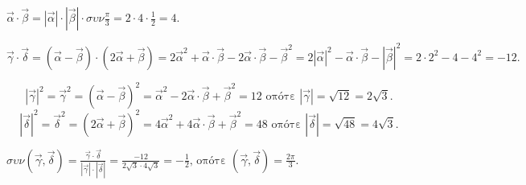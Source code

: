 
 $\vec{\alpha} \cdot \vec{\beta} = |\vec{\alpha}| \cdot |\vec{\beta}| \cdot \sigma\upsilon\nu \frac{\pi}{3} = 2 \cdot 4 \cdot \frac{1}{2} = 4$.

\[
\vec{\gamma} \cdot \vec{\delta} = (\vec{\alpha} - \vec{\beta}) \cdot (2\vec{\alpha} + \vec{\beta}) = 2\vec{\alpha}^2 + \vec{\alpha} \cdot \vec{\beta} - 2\vec{\alpha} \cdot \vec{\beta} - \vec{\beta}^2 = 2|\vec{\alpha}|^2 - \vec{\alpha} \cdot \vec{\beta} - |\vec{\beta}|^2 = 2 \cdot 2^2 - 4 - 4^2 = -12.
\]

\[
|\vec{\gamma}|^2 = \vec{\gamma}^2 = (\vec{\alpha} - \vec{\beta})^2 = \vec{\alpha}^2 - 2\vec{\alpha} \cdot \vec{\beta} + \vec{\beta}^2 = 12 \text{ οπότε } |\vec{\gamma}| = \sqrt{12} = 2\sqrt{3}.
\]
\[
|\vec{\delta}|^2 = \vec{\delta}^2 = (2\vec{\alpha} + \vec{\beta})^2 = 4\vec{\alpha}^2 + 4\vec{\alpha} \cdot \vec{\beta} + \vec{\beta}^2 = 48 \text{ οπότε } |\vec{\delta}| = \sqrt{48} = 4\sqrt{3}.
\]

 $\sigma\upsilon\nu(\vec{\gamma} \hat{,} \vec{\delta}) = \frac{\vec{\gamma} \cdot \vec{\delta}}{|\vec{\gamma}| \cdot |\vec{\delta}|} = \frac{-12}{2\sqrt{3} \cdot 4\sqrt{3}} = -\frac{1}{2}\text{, οπότε } (\vec{\gamma} \hat{,} \vec{\delta}) = \frac{2\pi}{3}$.